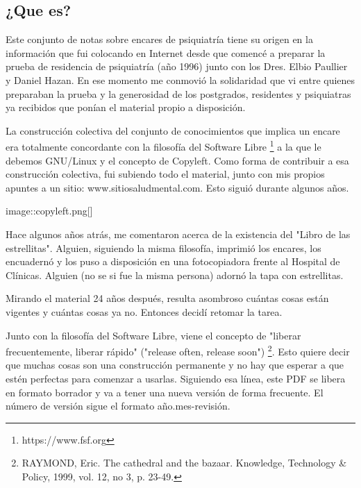 \documentclass[encares.tex]{subfiles}
\begin{document}
\subsection*{¿Que es?}
Este conjunto de notas sobre encares de psiquiatría tiene su origen en la información que fui colocando en Internet desde que comencé a preparar la prueba de residencia de psiquiatría (año 1996) junto con los Dres. Elbio Paullier y Daniel Hazan. En ese momento me conmovió la solidaridad que vi entre quienes preparaban la prueba y la generosidad de los postgrados, residentes y psiquiatras ya recibidos que ponían el material propio a disposición.

La construcción colectiva del conjunto de conocimientos que implica un encare era totalmente concordante con la filosofía del Software Libre \footnote{https://www.fsf.org} a la que le debemos GNU/Linux y el concepto de Copyleft. Como forma de contribuir a esa construcción colectiva, fui subiendo todo el material, junto con mis propios apuntes a un sitio: www.sitiosaludmental.com. Esto siguió durante algunos años.

image::copyleft.png[]

Hace algunos años atrás, me comentaron acerca de la existencia del "Libro de las estrellitas". Alguien, siguiendo la misma filosofía, imprimió los encares, los encuadernó y los puso a disposición en una fotocopiadora frente al Hospital de Clínicas. Alguien (no se si fue la misma persona) adornó la tapa con estrellitas.

Mirando el material 24 años después, resulta asombroso cuántas cosas están vigentes y cuántas cosas ya no. Entonces decidí retomar la tarea.

Junto con la filosofía del Software Libre, viene el concepto de "liberar frecuentemente, liberar rápido" ("release often, release soon") \footnote{RAYMOND, Eric. The cathedral and the bazaar. Knowledge, Technology \& Policy, 1999, vol. 12, no 3, p. 23-49.}. Esto quiere decir que muchas cosas son una construcción permanente y no hay que esperar a que estén perfectas para comenzar a usarlas. Siguiendo esa línea, este PDF se libera en formato borrador y va a tener una nueva versión de forma frecuente. El número de versión sigue el formato año.mes-revisión.
\end{document}
